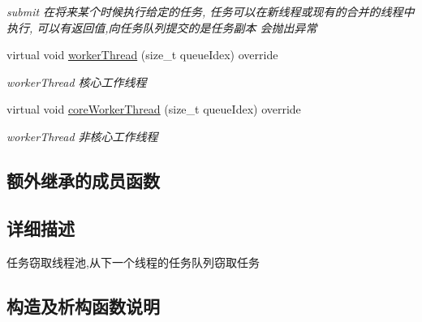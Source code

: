 \begin{DoxyCompactItemize}
\begin{DoxyCompactList}\small\item\em submit 在将来某个时候执行给定的任务, 任务可以在新线程或现有的合并的线程中执行, 可以有返回值,向任务队列提交的是任务副本 会抛出异常 \end{DoxyCompactList}\item 
virtual void \hyperlink{classWorkStealingThreadPoolExecutor_ab0414f5e006e8fc523bfd35ba276f705}{worker\+Thread} (size\+\_\+t queue\+Idex) override
\begin{DoxyCompactList}\small\item\em worker\+Thread 核心工作线程 \end{DoxyCompactList}\item 
virtual void \hyperlink{classWorkStealingThreadPoolExecutor_ae4170b80bdc4ec806ee4a04cc5daaada}{core\+Worker\+Thread} (size\+\_\+t queue\+Idex) override
\begin{DoxyCompactList}\small\item\em worker\+Thread 非核心工作线程 \end{DoxyCompactList}\end{DoxyCompactItemize}
\subsection*{额外继承的成员函数}


\subsection{详细描述}
任务窃取线程池,从下一个线程的任务队列窃取任务 

\subsection{构造及析构函数说明}
\mbox{\label{classWorkStealingThreadPoolExecutor_a3e4e9fd05b5b325f2f051725410525cb}} 
